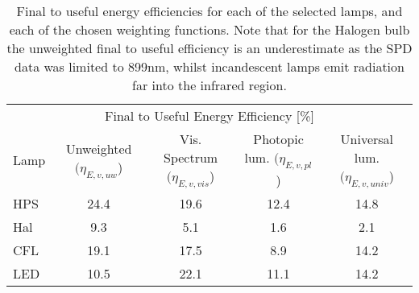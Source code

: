 
\begin{table}
\centering %
\caption{Final to useful energy efficiencies for each of the selected lamps, and each of the chosen weighting functions. Note that for the Halogen bulb the unweighted final to useful efficiency is an underestimate as the SPD data was limited to 899nm, whilst incandescent lamps emit radiation far into the infrared region. }
\begin{tabular}{l c c c c}
\hline
\multicolumn{5}{c}{Final to Useful Energy Efficiency [\%]} \\
\cline{2-5}
  Lamp 
      & Unweighted $(\eta_{E,v,uw}$)
      & Vis. Spectrum $(\eta_{E,v,vis}$)
      & Photopic lum. $(\eta_{E,v,pl}$)
      & Universal lum. $(\eta_{E,v,univ}$)  \\
\hline
  HPS & 24.4 & 19.6 & 12.4 & 14.8     \\
  Hal & 9.3 & 5.1 & 1.6 & 2.1    \\
  CFL & 19.1 & 17.5 & 8.9 & 14.2     \\
  LED & 10.5 & 22.1 & 11.1 & 14.2     \\
\hline
\end{tabular}
\label{tab:results_etas}
\end{table}